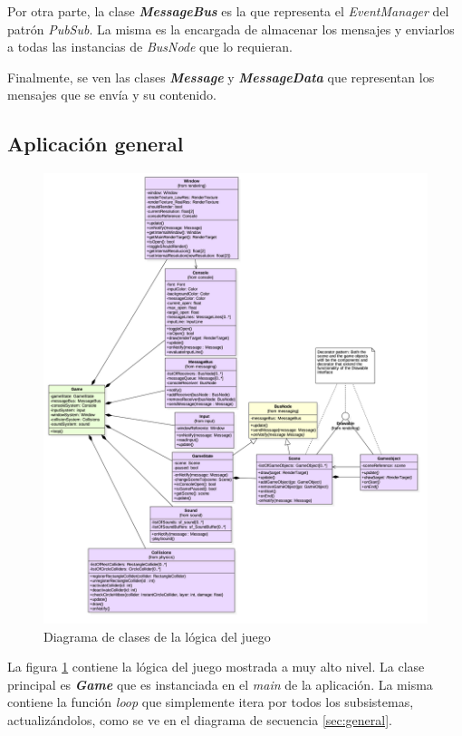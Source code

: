 \bigskip

Por otra parte, la clase \textbf{\textit{MessageBus}} es la que representa el \textit{EventManager} del patrón \textit{PubSub}. La misma es la encargada de almacenar los mensajes y enviarlos a todas las instancias de \textit{BusNode} que lo requieran.

\bigskip

Finalmente, se ven las clases \textbf{\textit{Message}} y \textbf{\textit{MessageData}} que representan los mensajes que se envía y su contenido.

\subsection{Aplicación general}

\begin{figure}
	\centerline{\includegraphics[width=18cm]{otros/UML/png/alld/png/gamelogic__diagramaDeClases_gamelogic_7.png}}
	\caption{Diagrama de clases de la lógica del juego}
	\label{class:gamelogic}
\end{figure}

La figura \ref{class:gamelogic} contiene la lógica del juego mostrada a muy alto nivel. La clase principal es \textbf{\textit{Game}} que es instanciada en el \textit{main} de la aplicación. La misma contiene la función \textit{loop} que simplemente itera por todos los subsistemas, actualizándolos, como se ve en el diagrama de secuencia \ref{sec:general}. 

